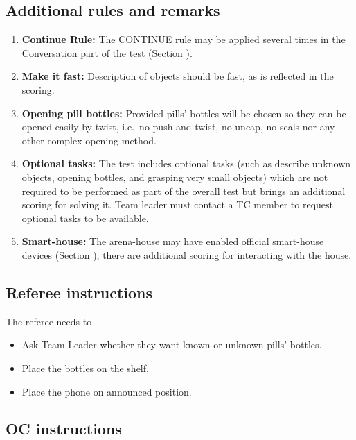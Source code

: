 \subsection{Additional rules and remarks}
\begin{enumerate}
	\item \textbf{Continue Rule:} The CONTINUE rule may be applied several times in the Conversation part of the test (Section ).

	\item \textbf{Make it fast:} Description of objects should be fast, as is reflected in the scoring.
	
	\item \textbf{Opening pill bottles:} Provided pills' bottles will be chosen so they can be opened easily by twist, i.e.~no push and twist, no uncap, no seals nor any other complex opening method.

	\item \textbf{Optional tasks:} The test includes optional tasks (such as describe unknown objects, opening bottles, and grasping very small objects) which are not required to be performed as part of the overall test but brings an additional scoring for solving it. Team leader must contact a TC member to request optional tasks to be available.

	\item \textbf{Smart-house:} The arena-house may have enabled official smart-house devices (Section ), there are additional scoring for interacting with the house.
\end{enumerate}

\subsection{Referee instructions}

The referee needs to
\begin{itemize}
	\item Ask Team Leader whether they want known or unknown pills' bottles.
	\item Place the bottles on the shelf.
	\item Place the phone on announced position.
\end{itemize}

\subsection{OC instructions}

